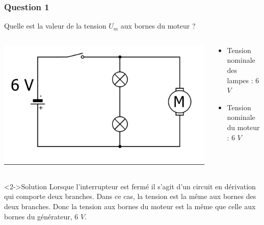 \documentclass[xcolor={dvipsnames}]{beamer}
\begin{document}
\begin{frame}
	\frametitle{Question 1}
	\begin{block}{}
		Quelle est la valeur de la tension $U_m$ aux bornes du moteur ?
	\end{block}

			
			\begin{columns}
				\begin{column}{0.4\textwidth}
					\includegraphics[scale=0.2]{../1_schema}
					
				\end{column}
				
				\begin{column}{0.6\textwidth}
					\begin{itemize}
						\item Tension nominale des lampes : 6 $V$
						\item Tension nominale du moteur : 6 $V$
					\end{itemize}		
					
				\end{column}
			\end{columns}

			\begin{block}<2->{Solution}
				Lorsque l'interrupteur est fermé il s'agit d'un circuit en dérivation qui comporte deux branches. Dans ce cas, la tension est la même aux bornes des deux branches. Donc la tension aux bornes du moteur est la même que celle aux bornes du générateur, 6 $V$.
			\end{block}
			

\end{frame}
\end{document}
